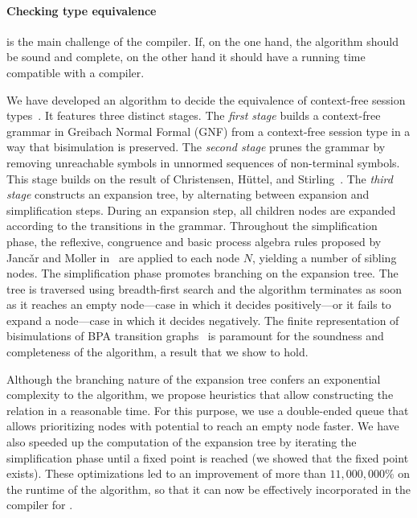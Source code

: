 
\paragraph{Checking type equivalence}

is the main challenge of the compiler. If, on the one hand, the
algorithm should be sound and complete, on the other hand it should
have a running time compatible with a compiler.  %

We have developed an algorithm to decide the equivalence of
context-free session types~\cite{typeEquivalence}.  It features three
distinct stages.
%
The \emph{first stage} builds a context-free grammar in Greibach
Normal Formal (GNF) %
from a context-free session type in a way that bisimulation is
preserved.
%
The \emph{second stage} prunes the grammar by removing unreachable
symbols in unnormed sequences of non-terminal symbols. This stage
builds on the result of Christensen, H\"uttel, and 
Stirling~\cite{DBLP:journals/iandc/ChristensenHS95}.
%
The \emph{third stage} constructs an expansion tree, by alternating
between expansion and simplification steps. During an expansion step, 
all children nodes are expanded according to the transitions in the 
grammar. %
Throughout the simplification phase, the reflexive, congruence and basic
process algebra rules proposed by Janc\v ar and Moller
in~\cite{janvcar1999techniques} are applied to each node $N$, yielding
a number of sibling nodes.  The simplification phase promotes
branching on the expansion tree.  The tree is traversed using
breadth-first search and the algorithm terminates as soon as it
reaches an empty node---case in which it decides positively---or it
fails to expand a node---case in which it decides negatively.  The
finite representation of bisimulations of BPA transition
graphs~\cite{caucal1986decidabilite,
  DBLP:journals/iandc/ChristensenHS95} is paramount for the soundness
and completeness of the algorithm, a result that we show to hold.

Although the branching nature of the expansion tree confers an
exponential complexity to the algorithm, we propose heuristics that
allow constructing the relation in a reasonable time. For this
purpose, we use a double-ended queue that allows prioritizing nodes
with potential to reach an empty node faster.  We have also speeded up
the computation of the expansion tree by iterating the simplification
phase until a fixed point is reached (we showed that the fixed point
exists).  These optimizations led to an improvement of more than
$11,000,000\%$ on the runtime of the algorithm, so that it can now be
effectively incorporated in the compiler for \freest.

